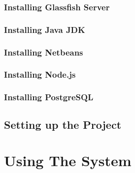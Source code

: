 \documentclass[a4paper,12pt]{article}
\begin{document}
\subsubsection{Installing Glassfish Server}
\subsubsection{Installing Java JDK}
\subsubsection{Installing Netbeans}
\subsubsection{Installing Node.js}
\subsubsection{Installing PostgreSQL}

\subsection{Setting up the Project}






\section{Using The System}




\end{document}
